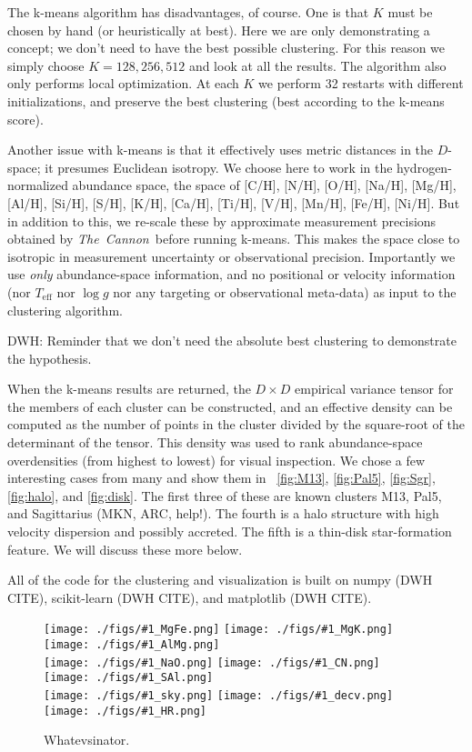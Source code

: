 \documentclass[12pt, letterpaper, preprint]{aastex}
\newcommand{\project}[1]{\textsl{#1}}
\newcommand{\thecannon}{\project{The~Cannon}}
\newcommand{\teff}{T_{\mathrm{eff}}}
\newcommand{\logg}{\log g}
\newcommand{\insanefigure}[1]{%
\texttt{[image: ./figs/\#1\_MgFe.png]}%
\texttt{[image: ./figs/\#1\_MgK.png]}%
\texttt{[image: ./figs/\#1\_AlMg.png]}\\
\texttt{[image: ./figs/\#1\_NaO.png]}%
\texttt{[image: ./figs/\#1\_CN.png]}%
\texttt{[image: ./figs/\#1\_SAl.png]}\\
\texttt{[image: ./figs/\#1\_sky.png]}%
\texttt{[image: ./figs/\#1\_decv.png]}%
\texttt{[image: ./figs/\#1\_HR.png]}}
\begin{document}
The k-means algorithm has disadvantages, of course.
One is that $K$ must be chosen by hand (or heuristically at best).
Here we are only demonstrating a concept; we don't need to have the
best possible clustering.
For this reason we simply choose $K=128, 256, 512$ and look at all the
results.
The algorithm also only performs local optimization.
At each $K$ we perform 32 restarts with different initializations, and
preserve the best clustering (best according to the k-means score).

Another issue with k-means is that it effectively uses metric
distances in the $D$-space; it presumes Euclidean isotropy.
We choose here to work in the hydrogen-normalized abundance space, the
space of [C/H], [N/H], [O/H], [Na/H], [Mg/H], [Al/H], [Si/H], [S/H],
[K/H], [Ca/H], [Ti/H], [V/H], [Mn/H], [Fe/H], [Ni/H].
But in addition to this, we re-scale these by approximate measurement
precisions obtained by \thecannon\ before running k-means.
This makes the space close to isotropic in measurement uncertainty or
observational precision.
Importantly we use \emph{only} abundance-space information, and no
positional or velocity information (nor $\teff$ nor $\logg$ nor any
targeting or observational meta-data) as input to the clustering
algorithm.

DWH: Reminder that we don't need the absolute best clustering to
demonstrate the hypothesis.

When the k-means results are returned, the $D\times D$ empirical
variance tensor for the members of each cluster can be constructed,
and an effective density can be computed as the number of points in
the cluster divided by the square-root of the determinant of the
tensor.
This density was used to rank abundance-space overdensities (from highest
to lowest) for visual inspection.
We chose a few interesting cases from many and show them in
\figurename~\ref{fig:M13}, \ref{fig:Pal5}, \ref{fig:Sgr},
\ref{fig:halo}, and \ref{fig:disk}.
The first three of these are known clusters M13, Pal5, and Sagittarius (MKN, ARC, help!).
The fourth is a halo structure with high velocity dispersion and possibly accreted.
The fifth is a thin-disk star-formation feature.
We will discuss these more below.

All of the code for the clustering and visualization is built on numpy
(DWH CITE), scikit-learn (DWH CITE), and matplotlib (DWH CITE).

\begin{figure}[!p]
\insanefigure{cluster_0256_0253}
\caption{Whatevsinator.\label{fig:infallcluster}}
\end{figure}
\end{document}
